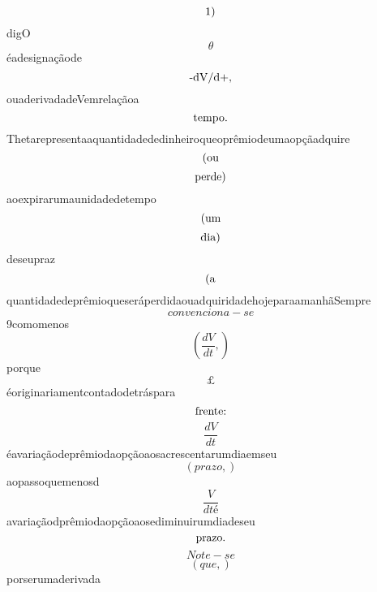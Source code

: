 \documentclass{article}
\begin{document}
\begin{equation}
$1)$
\end{equation}digO\begin{equation}
\theta
\end{equation}éadesignaçãode\begin{equation}
$-dV/d+,$
\end{equation}ouaderivadadeVemrelaçãoa\begin{equation}
$tempo.$
\end{equation}Thetarepresentaaquantidadededinheiroqueoprêmiodeumaopçãadquire\begin{equation}
$(ou$
\end{equation}\begin{equation}
$perde)$
\end{equation}aoexpirarumaunidadedetempo\begin{equation}
$(um$
\end{equation}\begin{equation}
$dia)$
\end{equation}deseupraz\begin{equation}
$(a$
\end{equation}quantidadedeprêmioqueseráperdidaouadquiridadehojeparaamanhãSempre\begin{equation}
convenciona - se
\end{equation}9comomenos\begin{equation}
\left( \frac{dV}{dt},\right)
\end{equation}porque\begin{equation}
£
\end{equation}éoriginariamentcontadodetráspara\begin{equation}
$frente:$
\end{equation}\begin{equation}
\frac{dV}{dt}
\end{equation}éavariaçãodeprêmiodaopçãoaosacrescentarumdiaemseu\begin{equation}
\left( prazo,\right)
\end{equation}aopassoquemenosd\begin{equation}
\frac{V}{dté}
\end{equation}avariaçãodprêmiodaopçãoaosediminuirumdiadeseu\begin{equation}
$prazo.$
\end{equation}\begin{equation}
Note - se
\end{equation}\begin{equation}
\left( que,\right)
\end{equation}porserumaderivada\begin{equation}

\end{equation}
\end{document}
